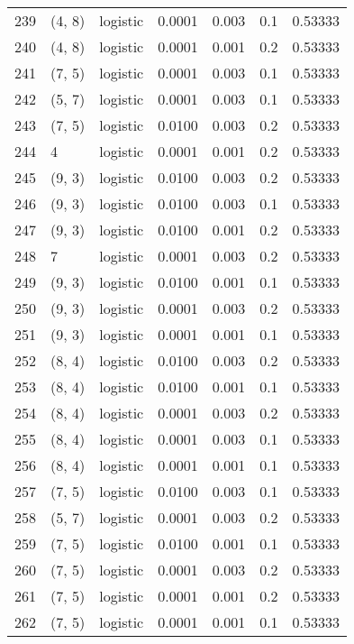 \begin{tabular}{lllrrrr}
239 &      (4, 8) &  logistic &  0.0001 &  0.003 &  0.1 &   0.53333 \\
240 &      (4, 8) &  logistic &  0.0001 &  0.001 &  0.2 &   0.53333 \\
241 &      (7, 5) &  logistic &  0.0001 &  0.003 &  0.1 &   0.53333 \\
242 &      (5, 7) &  logistic &  0.0001 &  0.003 &  0.1 &   0.53333 \\
243 &      (7, 5) &  logistic &  0.0100 &  0.003 &  0.2 &   0.53333 \\
244 &           4 &  logistic &  0.0001 &  0.001 &  0.2 &   0.53333 \\
245 &      (9, 3) &  logistic &  0.0100 &  0.003 &  0.2 &   0.53333 \\
246 &      (9, 3) &  logistic &  0.0100 &  0.003 &  0.1 &   0.53333 \\
247 &      (9, 3) &  logistic &  0.0100 &  0.001 &  0.2 &   0.53333 \\
248 &           7 &  logistic &  0.0001 &  0.003 &  0.2 &   0.53333 \\
249 &      (9, 3) &  logistic &  0.0100 &  0.001 &  0.1 &   0.53333 \\
250 &      (9, 3) &  logistic &  0.0001 &  0.003 &  0.2 &   0.53333 \\
251 &      (9, 3) &  logistic &  0.0001 &  0.001 &  0.1 &   0.53333 \\
252 &      (8, 4) &  logistic &  0.0100 &  0.003 &  0.2 &   0.53333 \\
253 &      (8, 4) &  logistic &  0.0100 &  0.001 &  0.1 &   0.53333 \\
254 &      (8, 4) &  logistic &  0.0001 &  0.003 &  0.2 &   0.53333 \\
255 &      (8, 4) &  logistic &  0.0001 &  0.003 &  0.1 &   0.53333 \\
256 &      (8, 4) &  logistic &  0.0001 &  0.001 &  0.1 &   0.53333 \\
257 &      (7, 5) &  logistic &  0.0100 &  0.003 &  0.1 &   0.53333 \\
258 &      (5, 7) &  logistic &  0.0001 &  0.003 &  0.2 &   0.53333 \\
259 &      (7, 5) &  logistic &  0.0100 &  0.001 &  0.1 &   0.53333 \\
260 &      (7, 5) &  logistic &  0.0001 &  0.003 &  0.2 &   0.53333 \\
261 &      (7, 5) &  logistic &  0.0001 &  0.001 &  0.2 &   0.53333 \\
262 &      (7, 5) &  logistic &  0.0001 &  0.001 &  0.1 &   0.53333 \\

\end{tabular}
